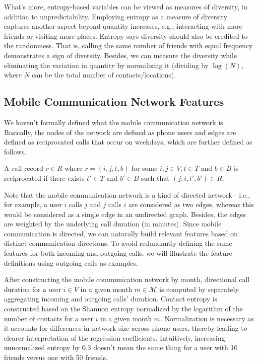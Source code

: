 What's more, entropy-based variables can be viewed as measures of diversity, in addition to unpredictability.
Employing entropy as a measure of diversity captures another aspect beyond quantity increases, e.g., interacting with more friends or visiting more places.
Entropy says diversity should also be credited to the randomness. That is, calling the same number of friends with equal frequency demonstrates a sign of diversity.
Besides, we can measure the diversity while eliminating the variation in quantity by normalizing it (dividing by \( \log(N) \), where \( N \) can be the total number of contacts/locations).

\subsection{Mobile Communication Network Features}
We haven't formally defined what the mobile communication network is. Basically, the nodes of the network are defined as phone users and edges are defined as reciprocated calls that occur on weekdays, which are further defined as follows.

\begin{definition}
A call record $r \in R$ where $r = (i, j, t, b)$ for some $i, j \in V, t \in T$ and $b \in B$ is reciprocated if there exists $t' \in T$ and $b' \in B$ such that $(j, i, t', b') \in R$.
\end{definition}

Note that the mobile communication network is a kind of directed network---i.e., for example, a user $i$ calls $j$ and $j$ calls $i$ are considered as two edges, whereas this would be considered as a single edge in an undirected graph. Besides, the edges are weighted by the underlying call duration (in minutes). Since mobile communication is directed, we can naturally build relevant features based on distinct communication directions.
To avoid redundantly defining the same features for both incoming and outgoing calls, we will illustrate the feature definitions using outgoing calls as examples.

After constructing the mobile communication network by month, directional call duration for a user \( i \in V \) in a given month \( m \in \mathcal{M} \) is computed by separately aggregating incoming and outgoing calls' duration.
Contact entropy is constructed based on the Shannon entropy normalized by the logarithm of the number of contacts for a user $i$ in a given month $m$.
Normalization is necessary as it accounts for differences in network size across phone users, thereby leading to clearer interpretation of the regression coefficients.
Intuitively, increasing unnormalized entropy by 0.3 doesn't mean the same thing for a user with 10 friends versus one with 50 friends.

